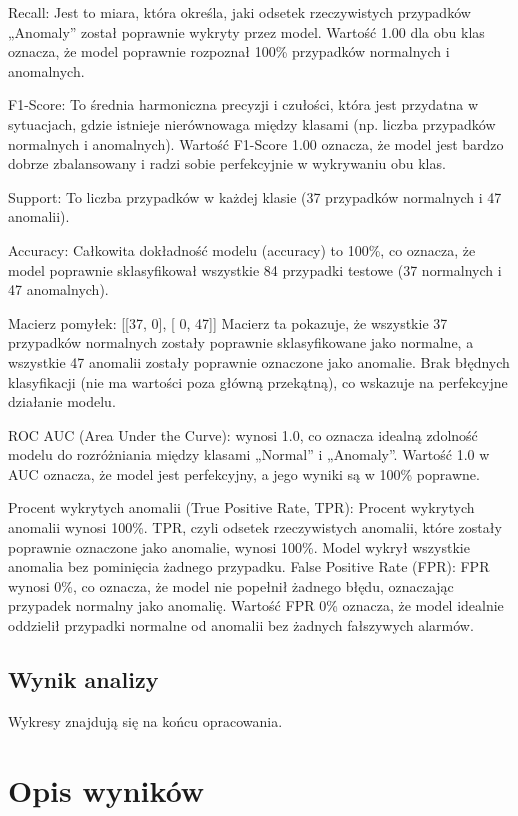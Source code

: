 \documentclass[a4paper,fleqn]{cas-dc}
\begin{document}
Recall: Jest to miara, która określa, jaki odsetek rzeczywistych przypadków „Anomaly” został poprawnie wykryty przez model. Wartość 1.00 dla obu klas oznacza, że model poprawnie rozpoznał 100\% przypadków normalnych i anomalnych.

F1-Score: To średnia harmoniczna precyzji i czułości, która jest przydatna w sytuacjach, gdzie istnieje nierównowaga między klasami (np. liczba przypadków normalnych i anomalnych). Wartość F1-Score 1.00 oznacza, że model jest bardzo dobrze zbalansowany i radzi sobie perfekcyjnie w wykrywaniu obu klas.

Support: To liczba przypadków w każdej klasie (37 przypadków normalnych i 47 anomalii).

Accuracy: Całkowita dokładność modelu (accuracy) to 100\%, co oznacza, że model poprawnie sklasyfikował wszystkie 84 przypadki testowe (37 normalnych i 47 anomalnych).

Macierz pomyłek:
[[37, 0],
 [ 0, 47]]
Macierz ta pokazuje, że wszystkie 37 przypadków normalnych zostały poprawnie sklasyfikowane jako normalne, a wszystkie 47 anomalii zostały poprawnie oznaczone jako anomalie. Brak błędnych klasyfikacji (nie ma wartości poza główną przekątną), co wskazuje na perfekcyjne działanie modelu.

ROC AUC (Area Under the Curve):  wynosi 1.0, co oznacza idealną zdolność modelu do rozróżniania między klasami „Normal” i „Anomaly”. Wartość 1.0 w AUC oznacza, że model jest perfekcyjny, a jego wyniki są w 100\% poprawne.

Procent wykrytych anomalii (True Positive Rate, TPR): Procent wykrytych anomalii wynosi 100\%. TPR, czyli odsetek rzeczywistych anomalii, które zostały poprawnie oznaczone jako anomalie, wynosi 100\%. Model wykrył wszystkie anomalia bez pominięcia żadnego przypadku.
False Positive Rate (FPR): FPR wynosi 0\%, co oznacza, że model nie popełnił żadnego błędu, oznaczając przypadek normalny jako anomalię. Wartość FPR 0\% oznacza, że model idealnie oddzielił przypadki normalne od anomalii bez żadnych fałszywych alarmów.


\subsection{Wynik analizy}

 Wykresy znajdują się na końcu opracowania.


\section{Opis wyników}
\end{document}
